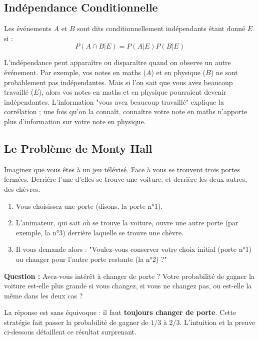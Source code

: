 \subsection{Indépendance Conditionnelle}

\begin{definitionbox}
Les événements $A$ et $B$ sont dits conditionnellement indépendants étant donné $E$ si :
$$P(A \cap B | E) = P(A|E)P(B|E)$$
\end{definitionbox}

\begin{intuitionbox}
L'indépendance peut apparaître ou disparaître quand on observe un autre événement. Par exemple, vos notes en maths ($A$) et en physique ($B$) ne sont probablement pas indépendantes. Mais si l'on sait que vous avez beaucoup travaillé ($E$), alors vos notes en maths et en physique pourraient devenir indépendantes. L'information "vous avez beaucoup travaillé" explique la corrélation ; une fois qu'on la connaît, connaître votre note en maths n'apporte plus d'information sur votre note en physique.
\end{intuitionbox}

\subsection{Le Problème de Monty Hall}

\begin{interludebox}
Imaginez que vous êtes à un jeu télévisé. Face à vous se trouvent trois portes fermées. Derrière l'une d'elles se trouve une voiture, et derrière les deux autres, des chèvres.
\begin{enumerate}
    \item Vous choisissez une porte (disons, la porte n°1).
    \item L'animateur, qui sait où se trouve la voiture, ouvre une autre porte (par exemple, la n°3) derrière laquelle se trouve une chèvre.
    \item Il vous demande alors : "Voulez-vous conserver votre choix initial (porte n°1) ou changer pour l'autre porte restante (la n°2) ?"
\end{enumerate}
\textbf{Question :} Avez-vous intérêt à changer de porte ? Votre probabilité de gagner la voiture est-elle plus grande si vous changez, si vous ne changez pas, ou est-elle la même dans les deux cas ?
\end{interludebox}

\begin{correctionbox}
La réponse est sans équivoque : il faut \textbf{toujours changer de porte}. Cette stratégie fait passer la probabilité de gagner de $1/3$ à $2/3$. L'intuition et la preuve ci-dessous détaillent ce résultat surprenant.
\end{correctionbox}

